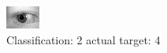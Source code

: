 \begin{figure}[h!]
\begin{center}
\includegraphics[width=0.60\columnwidth]{figures/ID819_class_2_target_4.png}
\end{center}
\caption{ Classification: 2 actual target: 4}
\label{fig:ID819_class_2_target_4}
\end{figure}
